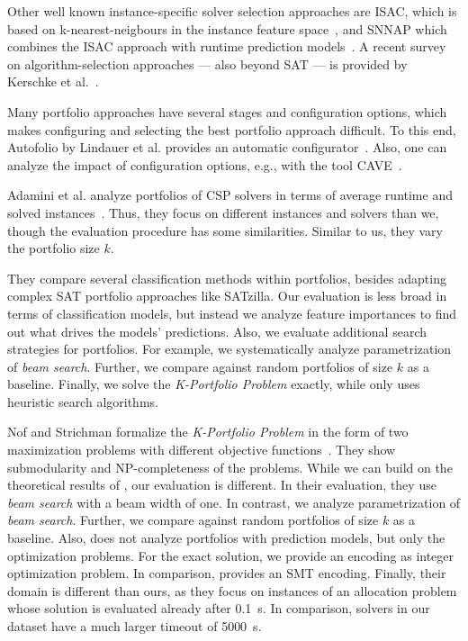 \documentclass[conference]{IEEEtran}
\begin{document}
Other well known instance-specific solver selection approaches are ISAC, which is based on k-nearest-neigbours in the instance feature space~\cite{Kadioglu:2010:ISAC}, and SNNAP which combines the ISAC approach with runtime prediction models~\cite{Collautti:2013:SNNAP}. 
A recent survey on algorithm-selection approaches --- also beyond SAT --- is provided by Kerschke et al.~\cite{kerschke2019automated}.

Many portfolio approaches have several stages and configuration options, which makes configuring and selecting the best portfolio approach difficult.
To this end, Autofolio by Lindauer et al. provides an automatic configurator~\cite{lindauer2015autofolio}.
Also, one can analyze the impact of configuration options, e.g., with the tool CAVE~\cite{biedenkapp2018cave}.

Adamini et al. analyze portfolios of CSP solvers in terms of average runtime and solved instances~\cite{amadini2014empirical, amadini2016extensive}. 
Thus, they focus on different instances and solvers than we, though the evaluation procedure has some similarities.
Similar to us, they vary the portfolio size $k$.

They compare several classification methods within portfolios, besides adapting complex SAT portfolio approaches like SATzilla.
Our evaluation is less broad in terms of classification models, but instead we analyze feature importances to find out what drives the models' predictions.
Also, we evaluate additional search strategies for portfolios.
For example, we systematically analyze parametrization of \emph{beam search}.
Further, we compare against random portfolios of size $k$ as a baseline.
Finally, we solve the \emph{K-Portfolio Problem} exactly, while \cite{amadini2014empirical} only uses heuristic search algorithms.

Nof and Strichman formalize the \emph{K-Portfolio Problem} in the form of two maximization problems with different objective functions~\cite{nof2020real}.
They show submodularity and NP-completeness of the problems.
While we can build on the theoretical results of \cite{nof2020real}, our evaluation is different.
In their evaluation, they use \emph{beam search} with a beam width of one.
In contrast, we analyze parametrization of \emph{beam search}.
Further, we compare against random portfolios of size $k$ as a baseline.
Also, \cite{nof2020real} does not analyze portfolios with prediction models, but only the optimization problems.
For the exact solution, we provide an encoding as integer optimization problem.
In comparison, \cite{nof2020real} provides an SMT encoding.
Finally, their domain is different than ours, as they focus on instances of an allocation problem whose solution is evaluated already after 0.1~s.
In comparison, solvers in our dataset have a much larger timeout of 5000~s.
\end{document}
